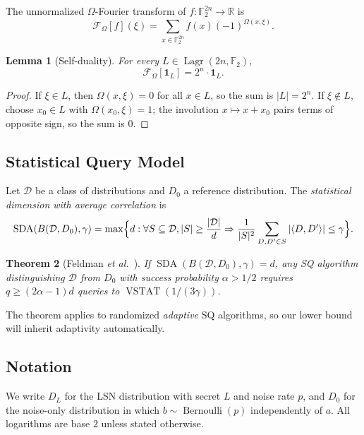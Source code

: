 \documentclass[11pt,a4paper]{article}
\theoremstyle{plain}
\newtheorem{theorem}{Theorem}[section]
\newtheorem{lemma}[theorem]{Lemma}
\theoremstyle{definition}
\newcommand{\F}{\mathbb{F}}
\DeclareMathOperator{\Lagr}{Lagr}
\DeclareMathOperator{\SDA}{SDA}
\DeclareMathOperator{\VSTAT}{VSTAT}
\newcommand{\etal}{\textit{et al.}}
\newcommand{\R}{\mathbb{R}}
\begin{document}
The unnormalized $\Omega$-Fourier transform of $f \colon \F_2^{2n} \to \R$ is
\[
\mathcal{F}_\Omega[f](\xi) = \sum_{x \in \F_2^{2n}} f(x) (-1)^{\Omega(x, \xi)}.
\]

\begin{lemma}[Self-duality]
For every $L \in \Lagr(2n,\F_2)$,
\[
\mathcal{F}_\Omega[\mathbf{1}_L] = 2^n \cdot \mathbf{1}_L.
\]
\end{lemma}

\begin{proof}
If $\xi \in L$, then $\Omega(x,\xi)=0$ for all $x \in L$, so the sum is $|L|=2^n$. If $\xi \notin L$, choose $x_0 \in L$ with $\Omega(x_0,\xi)=1$; the involution $x \mapsto x+x_0$ pairs terms of opposite sign, so the sum is $0$.
\end{proof}

\subsection{Statistical Query Model}
\label{subsec:sq}

Let $\mathcal{D}$ be a class of distributions and $D_0$ a reference distribution. The \emph{statistical dimension with average correlation} \cite{FGR+17} is
\[
\SDA(B(\mathcal{D},D_0),\gamma) = \max\Bigl\{d : \forall S \subseteq \mathcal{D}, |S| \geq \frac{|\mathcal{D}|}{d} \Rightarrow \frac{1}{|S|^2}\sum_{D,D' \in S} |\langle D,D' \rangle| \leq \gamma\Bigr\}.
\]

\begin{theorem}[Feldman \etal\ \cite{FGR+17}]
\label{thm:feldman}
If $\SDA(B(\mathcal{D},D_0),\gamma) = d$, any SQ algorithm distinguishing $\mathcal{D}$ from $D_0$ with success probability $\alpha > 1/2$ requires $q \geq (2\alpha - 1)d$ queries to $\VSTAT(1/(3\gamma))$.
\end{theorem}

The theorem applies to randomized \emph{adaptive} SQ algorithms, so our lower bound will inherit adaptivity automatically.

\subsection{Notation}
\label{subsec:notation}

We write $D_L$ for the LSN distribution with secret $L$ and noise rate $p$, and $D_0$ for the noise-only distribution in which $b \sim \operatorname{Bernoulli}(p)$ independently of $a$. All logarithms are base $2$ unless stated otherwise.
\end{document}
